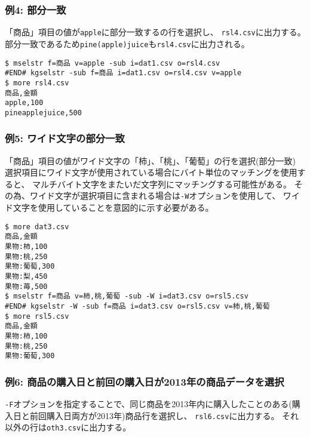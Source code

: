 \subsubsection*{例4: 部分一致}

「商品」項目の値が\verb|apple|に部分一致するの行を選択し、
\verb|rsl4.csv|に出力する。
部分一致であるため\verb|pine(apple)juice|も\verb|rsl4.csv|に出力される。


\begin{Verbatim}[baselinestretch=0.7,frame=single]
$ mselstr f=商品 v=apple -sub i=dat1.csv o=rsl4.csv
#END# kgselstr -sub f=商品 i=dat1.csv o=rsl4.csv v=apple
$ more rsl4.csv
商品,金額
apple,100
pineapplejuice,500
\end{Verbatim}
\subsubsection*{例5: ワイド文字の部分一致}

「商品」項目の値がワイド文字の「柿」、「桃」、「葡萄」の行を選択(部分一致)
選択項目にワイド文字が使用されている場合にバイト単位のマッチングを使用すると、
マルチバイト文字をまたいだ文字列にマッチングする可能性がある。
その為、ワイド文字が選択項目に含まれる場合は\verb|-W|オプションを使用して、
ワイド文字を使用していることを意図的に示す必要がある。


\begin{Verbatim}[baselinestretch=0.7,frame=single]
$ more dat3.csv
商品,金額
果物:柿,100
果物:桃,250
果物:葡萄,300
果物:梨,450
果物:苺,500
$ mselstr f=商品 v=柿,桃,葡萄 -sub -W i=dat3.csv o=rsl5.csv
#END# kgselstr -W -sub f=商品 i=dat3.csv o=rsl5.csv v=柿,桃,葡萄
$ more rsl5.csv
商品,金額
果物:柿,100
果物:桃,250
果物:葡萄,300
\end{Verbatim}
\subsubsection*{例6: 商品の購入日と前回の購入日が2013年の商品データを選択}

\verb|-F|オプションを指定することで、同じ商品を2013年内に購入したことのある(購入日と前回購入日両方が2013年)商品行を選択し、
\verb|rsl6.csv|に出力する。
それ以外の行は\verb|oth3.csv|に出力する。


